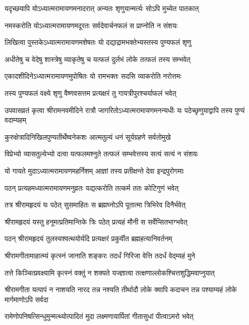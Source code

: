 \twolineshloka
{यदृच्छयापि योऽध्यात्मरामायणमनादरात्}
{अन्यतः शृणुयान्मर्त्यः सोऽपि मुच्येत पातकात्} %

\twolineshloka
{नमस्करोति योऽध्यात्मरामायणमदूरतः}
{सर्वदेवार्चनफलं स प्राप्नोति न संशयः} %

\twolineshloka
{लिखित्वा पुस्तकेऽध्यात्मरामायणमशेषतः}
{यो दद्याद्रामभक्तेभ्यस्तस्य पुण्यफलं शृणु} %

\twolineshloka
{अधीतेषु च वेदेषु शास्त्रेषु व्याकृतेषु च}
{यत्फलं दुर्लभं लोके तत्फलं तस्य सम्भवेत्} %

\twolineshloka
{एकादशीदिनेऽध्यात्मरामायणमुपोषितः}
{यो रामभक्तः सदसि व्याकरोति नरोत्तमः} %

\twolineshloka
{तस्य पुण्यफलं वक्ष्ये शृणु वैष्णवसत्तम}
{प्रत्यक्षरं तु गायत्रीपुरश्चर्याफलं भवेत्} %

\threelineshloka
{उपवासव्रतं कृत्वा श्रीरामनवमीदिने}
{रात्रौ जागरितोऽध्यात्मरामायणमनन्यधीः}
{यः पठेच्छृणुयाद्वापि तस्य पुण्यं वदाम्यहम्} %

\twolineshloka
{कुरुक्षेत्रादिनिखिलपुण्यतीर्थेष्वनेकशः}
{आत्मतुल्यं धनं सूर्यग्रहणे सर्वतोमुखे} %

\twolineshloka
{विप्रेभ्यो व्यासतुल्येभ्यो दत्वा यत्फलमश्नुते}
{तत्फलं सम्भवेत्तस्य सत्यं सत्यं न संशयः} %

\twolineshloka
{यो गायते मुदाऽध्यात्मरामायणमहर्निशम्}
{आज्ञां तस्य प्रतीक्षन्ते देवा इन्द्रपुरोगमाः} %

\twolineshloka
{पठन् प्रत्यहमध्यात्मरामायणमनुव्रतः}
{यद्यत्करोति तत्कर्म ततः कोटिगुणं भवेत्} %

\twolineshloka
{तत्र श्रीरामहृदयं यः पठेत् सुसमाहितः}
{स ब्रह्मघ्नोऽपि पूतात्मा त्रिभिरेव दिनैर्भवेत्} %

\twolineshloka
{श्रीरामहृदयं यस्तु हनूमत्प्रतिमान्तिके}
{त्रिः पठेत् प्रत्यहं मौनी स सर्वेप्सितभाग्भवेत्} %

\twolineshloka
{पठन् श्रीरामहृदयं तुलस्यश्वत्थयोर्यदि}
{प्रत्यक्षरं प्रकुर्वीत ब्रह्महत्यानिवर्तनम्} %

\twolineshloka
{श्रीरामगीतामाहात्म्यं कृत्स्नं जानाति शङ्करः}
{तदर्धं गिरिजा वेत्ति तदर्धं वेद्म्यहं मुने} %

\twolineshloka
{तत्ते किञ्चित्प्रवक्ष्यामि कृत्स्नं वक्तुं न शक्यते}
{यज्ज्ञात्वा तत्क्षणाल्लोकश्चित्तशुद्धिमवाप्नुयात्} %

\threelineshloka
{श्रीरामगीता यत्पापं न नाशयति नारद}
{तन्न नश्यति तीर्थादौ लोके क्वापि कदाचन}
{तन्न पश्याम्यहं लोके मार्गमाणोऽपि सर्वदा} %

\twolineshloka
{रामेणोपनिषत्सिन्धुमुन्मत्थ्योत्पादितं मुदा}
{लक्ष्मणायार्पितां गीतासुधां पीत्वाऽमरो भवेत्} %


